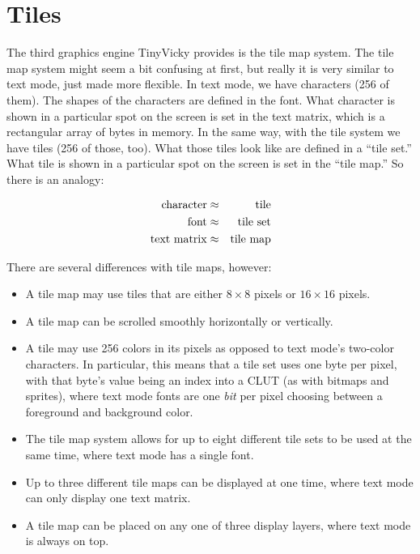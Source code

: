 \chapter{Tiles}
The third graphics engine TinyVicky provides is the tile map system. The tile map system might seem a bit confusing at first, but really it is very similar to text mode, just made more flexible. In text mode, we have characters (256 of them). The shapes of the characters are defined in the font. What character is shown in a particular spot on the screen is set in the text matrix, which is a rectangular array of bytes in memory. In the same way, with the tile system we have tiles (256 of those, too). What those tiles look like are defined in a ``tile set.'' What tile is shown in a particular spot on the screen is set in the ``tile map.'' So there is an analogy:

\begin{eqnarray*}
    {\rm character} & \approx & {\rm tile} \\
    {\rm font} & \approx & {\rm tile\ set} \\
    {\rm text\ matrix} & \approx & {\rm tile\ map} \\
\end{eqnarray*}

There are several differences with tile maps, however:

\begin{itemize}
    \item A tile map may use tiles that are either $8 \times 8$ pixels or $16 \times 16$ pixels.

    \item A tile map can be scrolled smoothly horizontally or vertically.

    \item A tile may use 256 colors in its pixels as opposed to text mode's two-color characters. In particular, this means that a tile set uses one byte per pixel, with that byte's value being an index into a CLUT (as with bitmaps and sprites), where text mode fonts are one {\em bit} per pixel choosing between a foreground and background color.

    \item The tile map system allows for up to eight different tile sets to be used at the same time, where text mode has a single font.

    \item Up to three different tile maps can be displayed at one time, where text mode can only display one text matrix.

    \item A tile map can be placed on any one of three display layers, where text mode is always on top.
\end{itemize}


